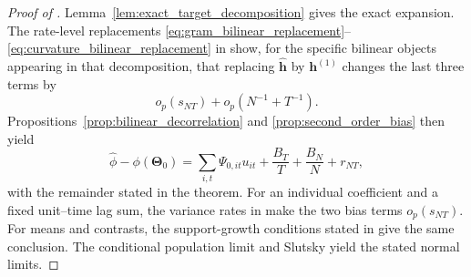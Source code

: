 \documentclass[11pt]{article}
\numberwithin{equation}{section}
\theoremstyle{remark}
\newcommand{\bTheta}{\bm\Theta}
\begin{document}
\begin{proof}[Proof of ]
Lemma~\ref{lem:exact_target_decomposition} gives the exact expansion. The rate-level replacements \eqref{eq:gram_bilinear_replacement}--\eqref{eq:curvature_bilinear_replacement} in  show, for the specific bilinear objects appearing in that decomposition, that replacing $\widehat{\bm h}$ by $\bm h^{(1)}$ changes the last three terms by
$$
o_p(s_{NT})+o_p(N^{-1}+T^{-1}).
$$
Propositions~\ref{prop:bilinear_decorrelation} and \ref{prop:second_order_bias} then yield
$$
\widehat\phi-\phi(\bTheta_0)
=
\sum_{i,t}\Psi_{0,it}u_{it}
+
\frac{B_T}{T}
+
\frac{B_N}{N}
+
r_{NT},
$$
with the remainder stated in the theorem. For an individual coefficient and a fixed unit--time lag sum, the variance rates in  make the two bias terms $o_p(s_{NT})$. For means and contrasts, the support-growth conditions stated in  give the same conclusion. The conditional population limit and Slutsky yield the stated normal limits.
\end{proof}
\end{document}
